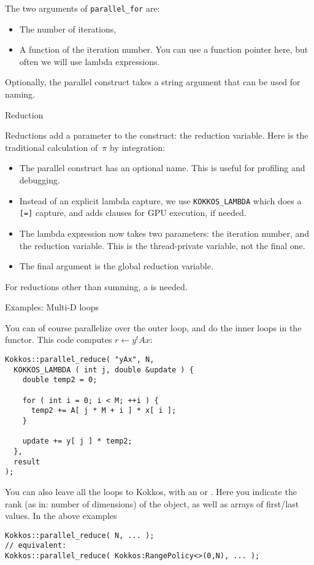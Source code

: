 The two arguments of \lstinline{parallel_for} are:
\begin{itemize}
\item The number of iterations,
\item A function of the iteration number.
  You can use a function pointer here, but often we will use lambda expressions.
\end{itemize}

Optionally, the parallel construct takes a string argument
that can be used for naming.

 {Reduction}

Reductions add a parameter to the construct: the reduction variable.
Here is the traditional calculation of~$\pi$ by integration:
%

\begin{itemize}
\item The parallel construct has an optional name.
  This is useful for profiling and debugging.
\item Instead of an explicit lambda capture, we use
  \lstinline+KOKKOS_LAMBDA+ which does a \lstinline+[=]+ capture,
  and adds clauses for \ac{GPU} execution, if needed.
\item The lambda expression now takes two parameters: the iteration number,
  and the reduction variable. This is the thread-private variable, not the final one.
\item The final argument is the global reduction variable.
\end{itemize}

For reductions other than summing, a  is needed.
%

 {Examples: Multi-D loops}

You can of course parallelize over the outer loop, and do the inner loops
in the functor.
This code computes $r\leftarrow y^tAx$:
%
\begin{lstlisting}
Kokkos::parallel_reduce( "yAx", N,
  KOKKOS_LAMBDA ( int j, double &update ) {
    double temp2 = 0;

    for ( int i = 0; i < M; ++i ) {
      temp2 += A[ j * M + i ] * x[ i ];
    }

    update += y[ j ] * temp2;
  },
  result
);  
\end{lstlisting}

You can also leave all the loops to Kokkos, with an
 or .
Here you indicate the rank (as in: number of dimensions) of the object,
as well as arrays of first/last values.
In the above examples
\begin{lstlisting}
Kokkos::parallel_reduce( N, ... );
// equivalent: 
Kokkos::parallel_reduce( Kokkos:RangePolicy<>(0,N), ... );  
\end{lstlisting}

